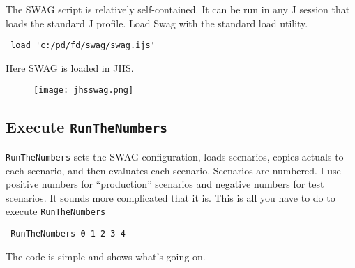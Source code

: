 The SWAG script is relatively self-contained. It can be run in any J
session that loads the standard J profile. Load Swag with the standard
load utility.

\begin{tcolorbox}[breakable, size=fbox, boxrule=1pt, pad at break*=1mm,colback=cellbackground, colframe=cellborder]
\begin{verbatim}
 load 'c:/pd/fd/swag/swag.ijs'
\end{verbatim}
\end{tcolorbox}

\noindent Here SWAG is loaded in JHS.


\captionsetup[figure]{labelformat=empty}
\begin{figure}[htbp]
\centering
\texttt{[image: jhsswag.png]}
\label{fig:5175X0}
\end{figure}

\subsection*{Execute \texttt{RunTheNumbers}}

\texttt{RunTheNumbers} sets the SWAG configuration, loads scenarios, copies
actuals to each scenario, and then evaluates each scenario. Scenarios
are numbered. I use positive numbers for ``production'' scenarios and
negative numbers for test scenarios. It sounds more complicated that it
is. This is all you have to do to execute \texttt{RunTheNumbers}

\begin{tcolorbox}[breakable, size=fbox, boxrule=1pt, pad at break*=1mm,colback=cellbackground, colframe=cellborder]
\begin{verbatim}
 RunTheNumbers 0 1 2 3 4 
\end{verbatim}
\end{tcolorbox}

\noindent The code is simple and shows what's going on.


